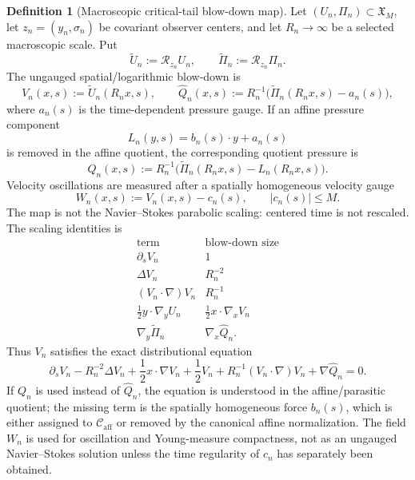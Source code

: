 \documentclass[11pt]{amsart}
\numberwithin{equation}{section}
\theoremstyle{plain}
\theoremstyle{definition}
\newtheorem{definition}[definition]{Definition}
\theoremstyle{remark}
\newcommand{\calR}{\mathcal R}
\newcommand{\Caff}{\mathcal C_{\mathrm{aff}}}
\begin{document}
\begin{definition}[Macroscopic critical-tail blow-down map]
\label{def:macroscopic-critical-tail-blowdown}
Let \((U_n,\Pi_n)\subset\mathfrak X_M\), let
\(z_n=(y_n,\sigma_n)\) be covariant observer centers, and let
\(R_n\to\infty\) be a selected macroscopic scale.  Put
\[
   \widetilde U_n:=\calR_{z_n}U_n,\qquad
   \widetilde\Pi_n:=\calR_{z_n}\Pi_n .
\]
The ungauged spatial/logarithmic blow-down is
\[
   V_n(x,s):=\widetilde U_n(R_nx,s),
   \qquad
   \widehat Q_n(x,s):=R_n^{-1}
      \bigl(\widetilde\Pi_n(R_nx,s)-a_n(s)\bigr),
\]
where \(a_n(s)\) is the time-dependent pressure gauge.  If an affine pressure
component
\[
   L_n(y,s)=b_n(s)\cdot y+a_n(s)
\]
is removed in the affine quotient, the corresponding quotient pressure is
\[
   Q_n(x,s):=R_n^{-1}
      \bigl(\widetilde\Pi_n(R_nx,s)-L_n(R_nx,s)\bigr).
\]
Velocity oscillations are measured after a spatially homogeneous velocity gauge
\[
   W_n(x,s):=V_n(x,s)-c_n(s),
   \qquad |c_n(s)|\le M .
\]
The map is not the Navier--Stokes parabolic scaling: centered time is not
rescaled.  The scaling identities is
\[
\begin{array}{c|c}
\text{term} & \text{blow-down size}\\ \hline
\partial_s V_n & 1\\
\Delta V_n & R_n^{-2}\\
(V_n\cdot\nabla)V_n & R_n^{-1}\\
\frac12 y\cdot\nabla_y U_n & \frac12 x\cdot\nabla_xV_n\\
\nabla_y\widetilde\Pi_n & \nabla_x\widehat Q_n .
\end{array}
\]
Thus \(V_n\) satisfies the exact distributional equation
\begin{equation}\label{eq:critical-tail-exact-blowdown-equation}
   \partial_sV_n
   -R_n^{-2}\Delta V_n
   +\frac12x\cdot\nabla V_n+\frac12V_n
   +R_n^{-1}(V_n\cdot\nabla)V_n
   +\nabla\widehat Q_n
   =0 .
\end{equation}
If \(Q_n\) is used instead of \(\widehat Q_n\), the equation is understood in
the affine/parasitic quotient; the missing term is the spatially homogeneous
force \(b_n(s)\), which is either assigned to \(\Caff\) or removed by the
canonical affine normalization.  The field \(W_n\) is used for oscillation and
Young-measure compactness, not as an ungauged Navier--Stokes solution unless the
time regularity of \(c_n\) has separately been obtained.
\end{definition}
\end{document}
